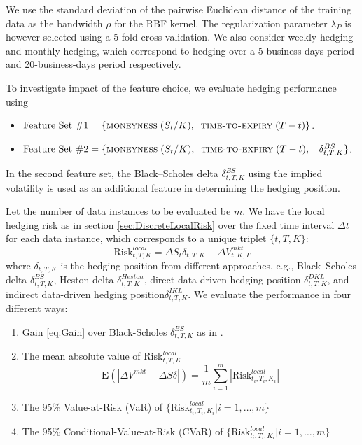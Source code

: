 \documentclass[letterpaper,12pt,titlepage,oneside,final]{book}
\numberwithin{equation}{section}
\theoremstyle{definition}
\newcommand{\E}{\mathbf{E}}
\newcommand{\DS}{\Delta S}
\newcommand{\DVmkt}{\Delta V^{mkt}}
\newcommand{\DT}{\Delta t}
\newcommand{\MeanAbs}{\E(|\DVmkt-\DS \delta |)}
\newcommand{\Smkt}{S}
\begin{document}
 We use the standard deviation of the pairwise Euclidean distance of the training data as the bandwidth $\rho$ for the RBF kernel. The regularization parameter $\lambda_P$  is however selected using a 5-fold cross-validation. We also consider weekly hedging and monthly hedging, which correspond to hedging over a 5-business-days period and 20-business-days period respectively.

To investigate impact of the feature choice,  we evaluate hedging performance using
\begin{itemize}
\item
$\text{Feature Set \#1} = \{\textsc{moneyness}\; (S_t/K),\;\;\textsc{time-to-expiry}\; (T-t)\}$.
\item
$\text{Feature Set \#2} = \{\textsc{moneyness} \;(S_t/K),\;\;\textsc{time-to-expiry} \;(T-t) ,\;\;~ \delta^{BS}_{t,T,K}\}$.
\end{itemize}
In the second feature set,  the Black–Scholes delta $\delta^{BS}_{t,T,K}$ using the implied volatility  is used as an additional feature in determining the hedging position. 

Let the number of data instances to be evaluated be $m$.
We have the local hedging risk as  in section \ref{sec:DiscreteLocalRisk} over the fixed time interval $\DT$ for each data instance, which corresponds to a unique triplet $\{t,T,K\}$:
\[
	\text{Risk}^{local}_{t,T,K}=\Delta \Smkt_{t} \delta_{t,T,K} -\Delta V^{mkt}_{t,K,T}
\]
where $\delta_{t,T,K}$ is the hedging position from different approaches, e.g., Black–Scholes delta $\delta^{BS}_{t,T,K}$, Heston delta $\delta^{Heston}_{t,T,K}$, direct data-driven hedging position $\delta^{DKL}_{t,T,K}$, and  indirect data-driven hedging position$\delta^{IKL}_{t,T,K}$.
We evaluate the performance in four different ways:
\begin{enumerate}
	\item Gain \eqref{eq:Gain} over Black-Scholes $\delta^{BS}_{t,T,K}$ as in \cite{hulloptimal}.
	\item The mean absolute value of $\text{Risk}^{local}_{t,T,K}$
	\[
		\MeanAbs=\frac{1}{m}\sum_{i=1}^m |\text{Risk}^{local}_{t_i,T_i,K_i}|
	\]

	\item The 95\% Value-at-Risk (VaR) of $\{\text{Risk}^{local}_{t_i,T_i,K_i}| i=1,\dots, m\}$
	\item The 95\% Conditional-Value-at-Risk (CVaR) of $\{\text{Risk}^{local}_{t_i,T_i,K_i}| i=1,\dots, m\}$
\end{enumerate}
\end{document}
